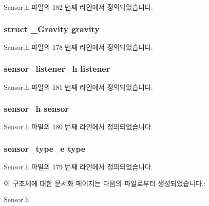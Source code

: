 Sensor.\-h 파일의 182 번째 라인에서 정의되었습니다.

\hypertarget{struct__GravityExtend_ae4623ab137188f79a517066e08032746}{
\subsubsection[{gravity}]{\setlength{\rightskip}{0pt plus 5cm}struct {\bf \-\_\-\-Gravity} gravity}}\label{struct__GravityExtend_ae4623ab137188f79a517066e08032746}


Sensor.\-h 파일의 178 번째 라인에서 정의되었습니다.

\hypertarget{struct__GravityExtend_aa977dfb866b24fd7d9a20a9a01b2fd1f}{
\subsubsection[{listener}]{\setlength{\rightskip}{0pt plus 5cm}sensor\-\_\-listener\-\_\-h listener}}\label{struct__GravityExtend_aa977dfb866b24fd7d9a20a9a01b2fd1f}


Sensor.\-h 파일의 181 번째 라인에서 정의되었습니다.

\hypertarget{struct__GravityExtend_a5bae9b7801bc3808411925cde81d3f26}{
\subsubsection[{sensor}]{\setlength{\rightskip}{0pt plus 5cm}sensor\-\_\-h sensor}}\label{struct__GravityExtend_a5bae9b7801bc3808411925cde81d3f26}


Sensor.\-h 파일의 180 번째 라인에서 정의되었습니다.

\hypertarget{struct__GravityExtend_abffb09766da2fc510a79bb51f82a36e1}{
\subsubsection[{type}]{\setlength{\rightskip}{0pt plus 5cm}sensor\-\_\-type\-\_\-e type}}\label{struct__GravityExtend_abffb09766da2fc510a79bb51f82a36e1}


Sensor.\-h 파일의 179 번째 라인에서 정의되었습니다.



이 구조체에 대한 문서화 페이지는 다음의 파일로부터 생성되었습니다.\-:\begin{DoxyCompactItemize}
\item 
Sensor.\-h\end{DoxyCompactItemize}
